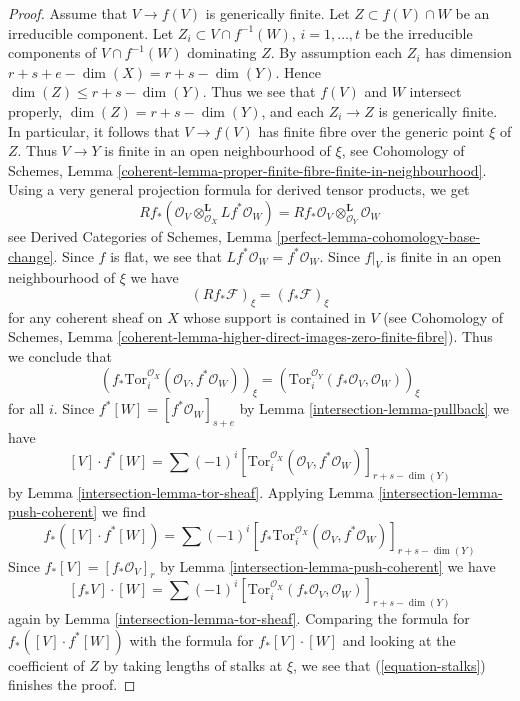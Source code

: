 \begin{proof}
\medskip\noindent
Assume that $V \to f(V)$ is generically finite. Let $Z \subset f(V) \cap W$
be an irreducible component. Let $Z_i \subset V \cap f^{-1}(W)$,
$i = 1, \ldots, t$ be the irreducible components of $V \cap f^{-1}(W)$
dominating $Z$. By assumption each $Z_i$ has dimension
$r + s + e - \dim(X) = r + s - \dim(Y)$. Hence
$\dim(Z) \leq r + s - \dim(Y)$. Thus we see that $f(V)$ and $W$
intersect properly, $\dim(Z) = r + s - \dim(Y)$, and each
$Z_i \to Z$ is generically finite. In particular, it follows that
$V \to f(V)$ has finite fibre over the generic point $\xi$ of $Z$.
Thus $V \to Y$ is finite in an open neighbourhood of $\xi$, see
Cohomology of Schemes, Lemma
\ref{coherent-lemma-proper-finite-fibre-finite-in-neighbourhood}.
Using a very general projection formula for derived tensor products, we get
$$
Rf_*(\mathcal{O}_V \otimes_{\mathcal{O}_X}^\mathbf{L} Lf^*\mathcal{O}_W) =
Rf_*\mathcal{O}_V \otimes_{\mathcal{O}_Y}^\mathbf{L} \mathcal{O}_W
$$
see Derived Categories of Schemes, Lemma
\ref{perfect-lemma-cohomology-base-change}.
Since $f$ is flat, we see that $Lf^*\mathcal{O}_W = f^*\mathcal{O}_W$.
Since $f|_V$ is finite in an open neighbourhood of $\xi$ we have
$$
(Rf_*\mathcal{F})_\xi = (f_*\mathcal{F})_\xi
$$
for any coherent sheaf on $X$ whose support is contained in $V$
(see Cohomology of Schemes, Lemma
\ref{coherent-lemma-higher-direct-images-zero-finite-fibre}). Thus
we conclude that
\begin{equation}
\label{equation-stalks}
\left(
f_*\text{Tor}_i^{\mathcal{O}_X}(\mathcal{O}_V, f^*\mathcal{O}_W)
\right)_\xi =
\left(\text{Tor}_i^{\mathcal{O}_Y}(f_*\mathcal{O}_V, \mathcal{O}_W)\right)_\xi
\end{equation}
for all $i$. Since $f^*[W] = [f^*\mathcal{O}_W]_{s + e}$ by
Lemma \ref{intersection-lemma-pullback} we have
$$
[V] \cdot f^*[W] =
\sum (-1)^i
[\text{Tor}_i^{\mathcal{O}_X}(\mathcal{O}_V,
f^*\mathcal{O}_W)]_{r + s - \dim(Y)}
$$
by Lemma \ref{intersection-lemma-tor-sheaf}. Applying
Lemma \ref{intersection-lemma-push-coherent}
we find
$$
f_*([V] \cdot f^*[W]) =
\sum (-1)^i
[f_*\text{Tor}_i^{\mathcal{O}_X}(\mathcal{O}_V,
f^*\mathcal{O}_W)]_{r + s - \dim(Y)}
$$
Since $f_*[V] = [f_*\mathcal{O}_V]_r$ by
Lemma \ref{intersection-lemma-push-coherent} we have
$$
[f_*V] \cdot [W] =
\sum (-1)^i
[\text{Tor}_i^{\mathcal{O}_X}(f_*\mathcal{O}_V,
\mathcal{O}_W)]_{r + s - \dim(Y)}
$$
again by Lemma \ref{intersection-lemma-tor-sheaf}.
Comparing the formula for $f_*([V] \cdot f^*[W])$ with
the formula for $f_*[V] \cdot [W]$ and looking at the
coefficient of $Z$ by taking lengths of stalks at $\xi$, we see that
(\ref{equation-stalks}) finishes the proof.
\end{proof}

